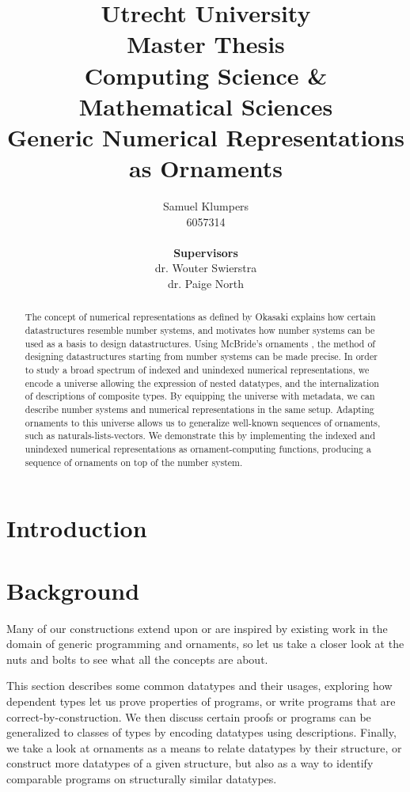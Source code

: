 \documentclass[9pt, final]{article}
\title{\large Utrecht University \\ Master Thesis \\ Computing Science \& Mathematical Sciences \\ \Large Generic Numerical Representations as Ornaments}
\author{Samuel Klumpers\\6057314\\ \\ \textbf{Supervisors} \\ dr. Wouter Swierstra \\ dr. Paige North}
\theoremstyle{plain}
\theoremstyle{definition}
\begin{document}
\maketitle

\newpage
\begin{abstract}
The concept of numerical representations as defined by Okasaki \cite{purelyfunctional} explains how certain datastructures resemble number systems, and motivates how number systems can be used as a basis to design datastructures. Using McBride's ornaments \cite{algorn}, the method of designing datastructures starting from number systems can be made precise. In order to study a broad spectrum of indexed and unindexed numerical representations, we encode a universe allowing the expression of nested datatypes, and the internalization of descriptions of composite types. By equipping the universe with metadata, we can describe number systems and numerical representations in the same setup. Adapting ornaments to this universe allows us to generalize well-known sequences of ornaments, such as naturals-lists-vectors. We demonstrate this by implementing the indexed and unindexed numerical representations as ornament-computing functions, producing a sequence of ornaments on top of the number system.
\end{abstract}


\newpage
\begin{small}
\tableofcontents
\end{small}
\newpage

\section{Introduction}\label{sec:introduction}



\section{Background}\label{part:background}
Many of our constructions extend upon or are inspired by existing work in the domain of generic programming and ornaments, so let us take a closer look at the nuts and bolts to see what all the concepts are about.

This section describes some common datatypes and their usages, exploring how dependent types let us prove properties of programs, or write programs that are correct-by-construction. We then discuss certain proofs or programs can be generalized to classes of types by encoding datatypes using descriptions. Finally, we take a look at ornaments as a means to relate datatypes by their structure, or construct more datatypes of a given structure, but also as a way to identify comparable programs on structurally similar datatypes.
\end{document}
